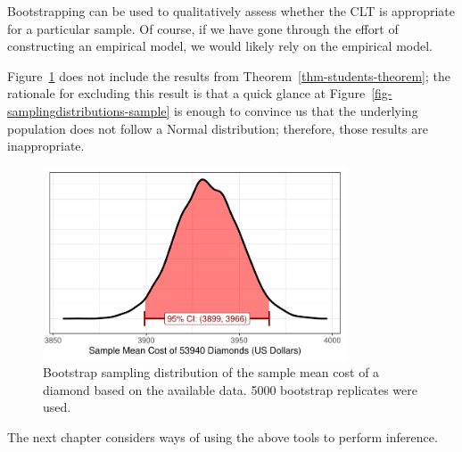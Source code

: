 \documentclass[
  letterpaper,
  DIV=11,
  numbers=noendperiod]{scrreprt}
\theoremstyle{definition}
\theoremstyle{definition}
\theoremstyle{plain}
\theoremstyle{remark}
\begin{document}
\begin{tcolorbox}[enhanced jigsaw, title=\textcolor{quarto-callout-note-color}{\faInfo}\hspace{0.5em}{Note}, colbacktitle=quarto-callout-note-color!10!white, titlerule=0mm, toptitle=1mm, breakable, bottomtitle=1mm, colframe=quarto-callout-note-color-frame, opacitybacktitle=0.6, bottomrule=.15mm, arc=.35mm, toprule=.15mm, colback=white, rightrule=.15mm, coltitle=black, leftrule=.75mm, left=2mm, opacityback=0]

Bootstrapping can be used to qualitatively assess whether the CLT is
appropriate for a particular sample. Of course, if we have gone through
the effort of constructing an empirical model, we would likely rely on
the empirical model.

\end{tcolorbox}

Figure~\ref{fig-samplingdistributions-bootstrap} does not include the
results from Theorem~\ref{thm-students-theorem}; the rationale for
excluding this result is that a quick glance at
Figure~\ref{fig-samplingdistributions-sample} is enough to convince us
that the underlying population does not follow a Normal distribution;
therefore, those results are inappropriate.

\begin{figure}

{\centering \includegraphics[width=0.8\textwidth,height=\textheight]{./images/fig-samplingdistributions-bootstrap-1.pdf}

}

\caption{\label{fig-samplingdistributions-bootstrap}Bootstrap sampling
distribution of the sample mean cost of a diamond based on the available
data. 5000 bootstrap replicates were used.}

\end{figure}

The next chapter considers ways of using the above tools to perform
inference.
\end{document}
